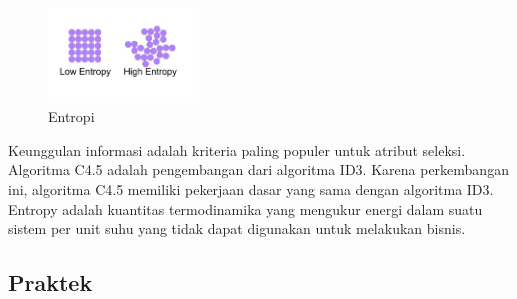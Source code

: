 \begin{enumerate}
	\hfill\break
	\begin{figure}[H]
		\includegraphics[width=4cm]{figures/1174031/2/entropi.jpg}
		\centering
		\caption{Entropi}
	\end{figure}
	\hfill\break
	Keunggulan informasi adalah kriteria paling populer untuk atribut seleksi. Algoritma C4.5 adalah pengembangan dari algoritma ID3. 
	Karena perkembangan ini, algoritma C4.5 memiliki pekerjaan dasar yang sama dengan algoritma ID3.
	Entropy adalah kuantitas termodinamika yang mengukur energi dalam suatu sistem per unit suhu yang tidak dapat digunakan untuk melakukan bisnis.
\end{enumerate}
\subsection{Praktek}

